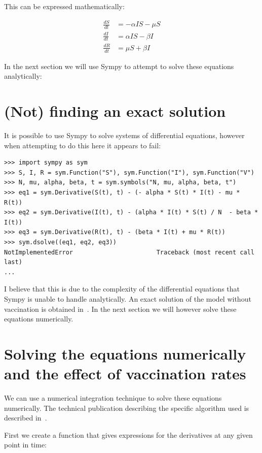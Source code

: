 \documentclass[a4paper]{article}
\begin{document}
This can be expressed mathematically:

\begin{align}
    \frac{dS}{dt} &= - \alpha I S - \mu S\\
    \frac{dI}{dt} &=  \alpha I S - \beta I\\
    \frac{dR}{dt} &=  \mu S + \beta I
\end{align}

In the next section we will use Sympy to attempt to solve these equations
analytically:

\section{(Not) finding an exact solution}

It is possible to use Sympy to solve systems of differential equations, however
when attempting to do this here it appears to fail:

\begin{verbatim}
>>> import sympy as sym
>>> S, I, R = sym.Function("S"), sym.Function("I"), sym.Function("V")
>>> N, mu, alpha, beta, t = sym.symbols("N, mu, alpha, beta, t")
>>> eq1 = sym.Derivative(S(t), t) - (- alpha * S(t) * I(t) - mu * R(t))
>>> eq2 = sym.Derivative(I(t), t) - (alpha * I(t) * S(t) / N  - beta * I(t))
>>> eq3 = sym.Derivative(R(t), t) - (beta * I(t) + mu * R(t))
>>> sym.dsolve((eq1, eq2, eq3))
NotImplementedError                       Traceback (most recent call last)
...
\end{verbatim}

I believe that this is due to the complexity of the differential equations that
Sympy is unable to handle analytically. An exact solution of the model without
vaccination is obtained in~\cite{harko2014exact}.
In the next section we will however solve these equations numerically.

\section{Solving the equations numerically and the effect of vaccination rates}

We can use a numerical integration technique to solve these equations
numerically. The technical publication describing the specific algorithm used is
described in~\cite{radhakrishnan1993description}.

First we create a function that gives expressions for the
derivatives at any given point in time:
\end{document}

